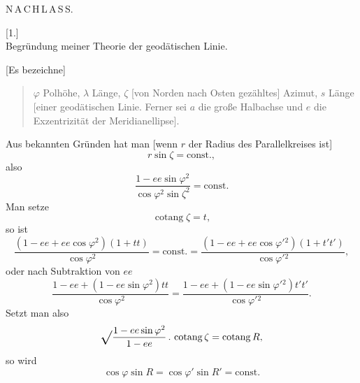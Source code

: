 \begingroup
\setlength{\abovedisplayskip}{6pt}
\setlength{\belowdisplayskip}{6pt}
\setlength{\abovedisplayshortskip}{3pt}
\setlength{\belowdisplayshortskip}{4pt}
\def\ixrad{\mathord{\vcenter{\hbox{\Large\(\surd\)}}}}
\def\ixeq#1#2{%
  \par\noindent\hspace{.06\linewidth}%
  \makebox[.10\linewidth][l]{#1}%
  \makebox[.68\linewidth][c]{\(\displaystyle #2\)}\par\smallskip}
\def\ixmathdots#1{\mathinner{\ifcase#1\or.\or.\,.\or.\,.\,.\or.\,.\,.\,.\or.\,.\,.\,.\,.\fi}}
\def\ixpoints#1{\(\ixmathdots{#1}\)}

\par\clearpage

\vspace*{.10\textheight}
\begin{center}{\LARGE N\,A\,C\,H\,L\,A\,S\,S.}\end{center}
\vspace{.05\textheight}
\begin{center}
[1.]\\[.5ex]
Begründung meiner Theorie der geodätischen Linie.
\end{center}

[Es bezeichne]
\begin{quote}
\(\varphi\) Polhöhe, \(\lambda\) Länge, \(\zeta\) [von Norden nach Osten gezähltes] Azimut, \(s\) Länge
[einer geodätischen Linie. Ferner sei \(a\) die große Halbachse und \(e\) die
Exzentrizität der Meridianellipse].
\end{quote}

Aus bekannten Gründen hat man [wenn \(r\) der Radius des Parallelkreises ist]
\[
r\sin\zeta=\text{const.},
\]
\noindent also
\[
\frac{1-ee\sin\varphi^2}{\cos\varphi^2\sin\zeta^2}=\text{const.}
\]
Man setze
\[
\operatorname{cotang}\zeta=t,
\]
\noindent so ist
\[
\frac{(1-ee+ee\cos\varphi^2)(1+tt)}{\cos\varphi^2}
=\text{const.}=
\frac{(1-ee+ee\cos\varphi'{}^2)(1+t't')}{\cos\varphi'{}^2},
\]
\noindent oder nach Subtraktion von \(ee\)
\[
\frac{1-ee+(1-ee\sin\varphi^2)tt}{\cos\varphi^2}
=\frac{1-ee+(1-ee\sin\varphi'{}^2)t't'}{\cos\varphi'{}^2}.
\]
Setzt man also
\[
\ixrad\frac{1-ee\sin\varphi^2}{1-ee}\,.\,\operatorname{cotang}\zeta
=\operatorname{cotang}R,
\]
\noindent so wird
\[
\cos\varphi\sin R=\cos\varphi'\sin R'=\text{const.}
\]

\par\clearpage
\noindent\makebox[12mm][l]{}\par\medskip

